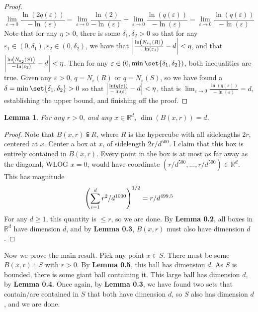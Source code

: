 \documentclass[12pt]{article}
\newtheorem{lemma}[theorem]{Lemma}
\theoremstyle{definition}
\theoremstyle{remark}
\newcommand{\R}{\mathbb{R}}
\newcommand{\ve}{\varepsilon}
\begin{document}
\begin{enumerate}[leftmargin=\labelsep]
\begin{proof}
			\[ \lim_{\ve \to 0} \frac{\ln(2q(\ve))}{-\ln(\ve)} = \lim_{\ve \to 0} \frac{\ln(2)}{-\ln(\ve)} +  \lim_{\ve \to 0} \frac{\ln(q(\ve))}{-\ln(\ve)} = \lim_{\ve \to 0} \frac{\ln(q(\ve))}{-\ln(\ve)}\] 
			Note that for any $\eta > 0$, there is some $\delta_1, \delta_2 > 0$ so that for any $\ve_1 \in (0, \delta_1), \ve_2 \in (0, \delta_2)$, we have that $\qty|\frac{\ln(N_{\ve_1}(R))}{-\ln(\ve_1)} - d| < \eta$, and that $\qty|\frac{\ln(N_{\ve_2}(S))}{-\ln(\ve_2)} - d| < \eta$. Then for any $\ve \in (0, \min \set{\delta_1, \delta_2})$, both inequalities are true. Given any $\ve > 0$, $q = N_\ve(R)$ or $q=N_\ve(S)$, so we have found a $\delta = \min \set{\delta_1, \delta_2} > 0$ so that $\qty|\frac{\ln(q(\ve))}{-\ln(\ve)} - d| < \eta$, that is $\lim_{\ve \to 0} \frac{\ln(q(\ve))}{-\ln(\ve)} = d$, establishing the upper bound, and finishing off the proof.
		\end{proof}
		\begin{lemma}
			For any $r > 0$, and any $x \in \R^d$, $\dim(B(x, r)) = d$.
		\end{lemma}
		\begin{proof}
			Note that $B(x, r) \subseteqq R$, where $R$ is the hypercube with all sidelengths $2r$, centered at $x$. Center a box at $x$, of sidelength $2r/d^{500}$. I claim that this box is entirely contained in $B(x, r)$. Every point in the box is at most as far away as the diagonal, WLOG $x=0$, would have coordinate $(r/d^{500}, \ldots, r/d^{500}) \in \R^d$. This has magnitude \[\qty(\sum_{i=1}^{d} r^2/d^{1000})^{1/2} = r/d^{499.5}\] For any $d \geq 1$, this quantity is $\leq r$, so we are done. By \textbf{Lemma 0.2}, all boxes in $\R^d$ have dimension $d$, and by \textbf{Lemma 0.3}, $B(x, r)$ must also have dimension $d$.
		\end{proof}
		Now we prove the main result. Pick any point $x \in S$. There must be some $B(x, r) \subseteqq S$ with $r > 0$. By \textbf{Lemma 0.5}, this ball has dimension $d$. As $S$ is bounded, there is some giant ball containing it. This large ball has dimension $d$, by \textbf{Lemma 0.4}. Once again, by \textbf{Lemma 0.3}, we have found two sets that contain/are contained in $S$ that both have dimension $d$, so $S$ also has dimension $d$, and we are done.
		

\end{enumerate}
\end{document}
